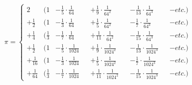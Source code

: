 \documentclass[11pt]{article}
\begin{document}
\begin{equation*}
  \pi = \left \{
  \begin{aligned}
     2              &( 1            &- \tfrac{1}{5}\cdot\tfrac{1}{64}   &&+ \tfrac{1}{9}\cdot\tfrac{1}{64^2}    &&- \tfrac{1}{13}\cdot\tfrac{1}{64^3}   &&- etc. ) \\
    + \tfrac{1}{2}  &( 1            &- \tfrac{1}{3}\cdot\tfrac{1}{64}   &&+ \tfrac{1}{5}\cdot\tfrac{1}{64^2}    &&- \tfrac{1}{7}\cdot\tfrac{1}{64^3}    &&- etc. ) \\
    + \tfrac{1}{4}  &( \tfrac{1}{3} &- \tfrac{1}{7}\cdot\tfrac{1}{64}   &&+ \tfrac{1}{11}\cdot\tfrac{1}{64^2}   &&- \tfrac{1}{15}\cdot\tfrac{1}{64^3}   &&- etc. ) \\
    + \tfrac{1}{2}  &( 1            &- \tfrac{1}{5}\cdot\tfrac{1}{1024} &&+ \tfrac{1}{9}\cdot\tfrac{1}{1024^2}  &&- \tfrac{1}{13}\cdot\tfrac{1}{1024^3} &&- etc. ) \\
    + \tfrac{1}{16} &( 1            &- \tfrac{1}{3}\cdot\tfrac{1}{1024} &&+ \tfrac{1}{5}\cdot\tfrac{1}{1024^2}  &&- \tfrac{1}{7}\cdot\tfrac{1}{1024^3}  &&- etc. ) \\
    + \tfrac{1}{64} &( \tfrac{1}{3} &- \tfrac{1}{7}\cdot\tfrac{1}{1024} &&+ \tfrac{1}{11}\cdot\tfrac{1}{1024^2} &&- \tfrac{1}{15}\cdot\tfrac{1}{1024^3} &&- etc. )
  \end{aligned}
  \right.
\end{equation*}
\end{document}
